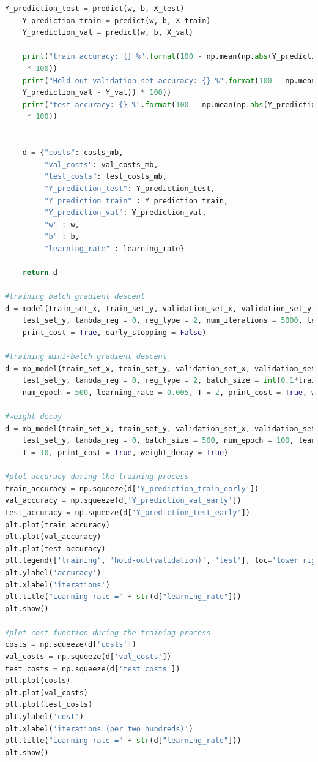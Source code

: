 \documentclass{article} %
\begin{document}
{\begin{lstlisting}[language=Python]
    Y_prediction_test = predict(w, b, X_test)
    Y_prediction_train = predict(w, b, X_train)
    Y_prediction_val = predict(w, b, X_val)

    print("train accuracy: {} %".format(100 - np.mean(np.abs(Y_prediction_train - Y_train))
	 * 100))
    print("Hold-out validation set accuracy: {} %".format(100 - np.mean(np.abs(
	Y_prediction_val - Y_val)) * 100))
    print("test accuracy: {} %".format(100 - np.mean(np.abs(Y_prediction_test - Y_test))
	 * 100))

    
    d = {"costs": costs_mb,
         "val_costs": val_costs_mb,
         "test_costs": test_costs_mb,
         "Y_prediction_test": Y_prediction_test, 
         "Y_prediction_train" : Y_prediction_train,
         "Y_prediction_val": Y_prediction_val,
         "w" : w, 
         "b" : b,
         "learning_rate" : learning_rate}
    
    return d

#training batch gradient descent
d = model(train_set_x, train_set_y, validation_set_x, validation_set_y, test_set_x, 
	test_set_y, lambda_reg = 0, reg_type = 2, num_iterations = 5000, learning_rate = 0.01, 
	print_cost = True, early_stopping = False)

#training mini-batch gradient descent
d = mb_model(train_set_x, train_set_y, validation_set_x, validation_set_y, test_set_x, 
	test_set_y, lambda_reg = 0, reg_type = 2, batch_size = int(0.1*train_set_x.shape[1]), 
	num_epoch = 500, learning_rate = 0.005, T = 2, print_cost = True, weight_decay = False)

#weight-decay
d = mb_model(train_set_x, train_set_y, validation_set_x, validation_set_y, test_set_x, 
	test_set_y, lambda_reg = 0, batch_size = 500, num_epoch = 100, learning_rate = 0.01, 
	T = 10, print_cost = True, weight_decay = True)

#plot accuracy during the training process
train_accuracy = np.squeeze(d['Y_prediction_train_early'])
val_accuracy = np.squeeze(d['Y_prediction_val_early'])
test_accuracy = np.squeeze(d['Y_prediction_test_early'])
plt.plot(train_accuracy)
plt.plot(val_accuracy)
plt.plot(test_accuracy)
plt.legend(['training', 'hold-out(validation)', 'test'], loc='lower right')
plt.ylabel('accuracy')
plt.xlabel('iterations')
plt.title("Learning rate =" + str(d["learning_rate"]))
plt.show()

#plot cost function during the training process
costs = np.squeeze(d['costs'])
val_costs = np.squeeze(d['val_costs'])
test_costs = np.squeeze(d['test_costs'])
plt.plot(costs)
plt.plot(val_costs)
plt.plot(test_costs)
plt.ylabel('cost')
plt.xlabel('iterations (per two hundreds)')
plt.title("Learning rate =" + str(d["learning_rate"]))
plt.show()


\end{lstlisting}}
\end{document}
